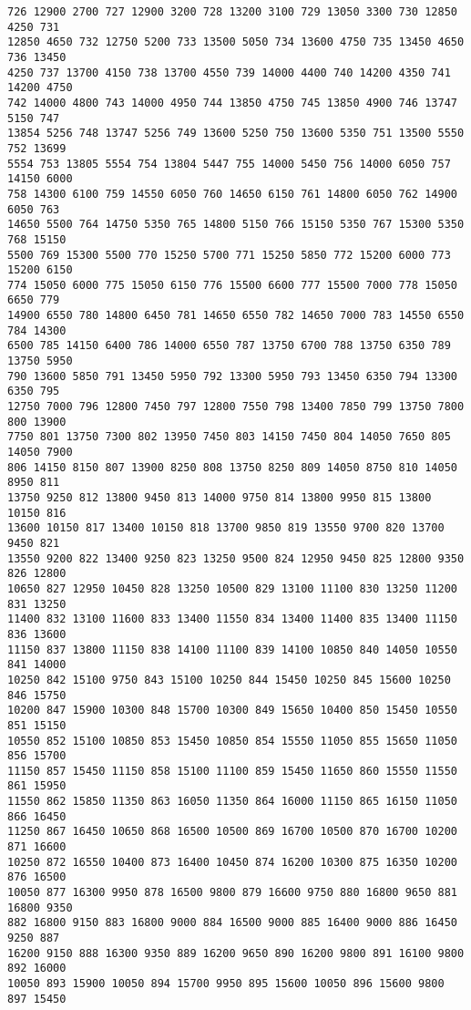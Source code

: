 \documentclass[11pt]{article}
\begin{document}
\begin{Verbatim}[commandchars=\\\{\}]
726 12900 2700 727 12900 3200 728 13200 3100 729 13050 3300 730 12850 4250 731
12850 4650 732 12750 5200 733 13500 5050 734 13600 4750 735 13450 4650 736 13450
4250 737 13700 4150 738 13700 4550 739 14000 4400 740 14200 4350 741 14200 4750
742 14000 4800 743 14000 4950 744 13850 4750 745 13850 4900 746 13747 5150 747
13854 5256 748 13747 5256 749 13600 5250 750 13600 5350 751 13500 5550 752 13699
5554 753 13805 5554 754 13804 5447 755 14000 5450 756 14000 6050 757 14150 6000
758 14300 6100 759 14550 6050 760 14650 6150 761 14800 6050 762 14900 6050 763
14650 5500 764 14750 5350 765 14800 5150 766 15150 5350 767 15300 5350 768 15150
5500 769 15300 5500 770 15250 5700 771 15250 5850 772 15200 6000 773 15200 6150
774 15050 6000 775 15050 6150 776 15500 6600 777 15500 7000 778 15050 6650 779
14900 6550 780 14800 6450 781 14650 6550 782 14650 7000 783 14550 6550 784 14300
6500 785 14150 6400 786 14000 6550 787 13750 6700 788 13750 6350 789 13750 5950
790 13600 5850 791 13450 5950 792 13300 5950 793 13450 6350 794 13300 6350 795
12750 7000 796 12800 7450 797 12800 7550 798 13400 7850 799 13750 7800 800 13900
7750 801 13750 7300 802 13950 7450 803 14150 7450 804 14050 7650 805 14050 7900
806 14150 8150 807 13900 8250 808 13750 8250 809 14050 8750 810 14050 8950 811
13750 9250 812 13800 9450 813 14000 9750 814 13800 9950 815 13800 10150 816
13600 10150 817 13400 10150 818 13700 9850 819 13550 9700 820 13700 9450 821
13550 9200 822 13400 9250 823 13250 9500 824 12950 9450 825 12800 9350 826 12800
10650 827 12950 10450 828 13250 10500 829 13100 11100 830 13250 11200 831 13250
11400 832 13100 11600 833 13400 11550 834 13400 11400 835 13400 11150 836 13600
11150 837 13800 11150 838 14100 11100 839 14100 10850 840 14050 10550 841 14000
10250 842 15100 9750 843 15100 10250 844 15450 10250 845 15600 10250 846 15750
10200 847 15900 10300 848 15700 10300 849 15650 10400 850 15450 10550 851 15150
10550 852 15100 10850 853 15450 10850 854 15550 11050 855 15650 11050 856 15700
11150 857 15450 11150 858 15100 11100 859 15450 11650 860 15550 11550 861 15950
11550 862 15850 11350 863 16050 11350 864 16000 11150 865 16150 11050 866 16450
11250 867 16450 10650 868 16500 10500 869 16700 10500 870 16700 10200 871 16600
10250 872 16550 10400 873 16400 10450 874 16200 10300 875 16350 10200 876 16500
10050 877 16300 9950 878 16500 9800 879 16600 9750 880 16800 9650 881 16800 9350
882 16800 9150 883 16800 9000 884 16500 9000 885 16400 9000 886 16450 9250 887
16200 9150 888 16300 9350 889 16200 9650 890 16200 9800 891 16100 9800 892 16000
10050 893 15900 10050 894 15700 9950 895 15600 10050 896 15600 9800 897 15450

\end{Verbatim}
\end{document}
